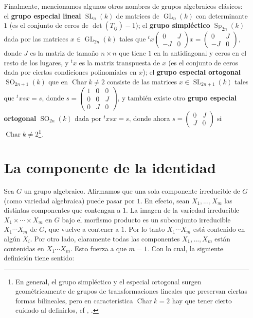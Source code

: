 \documentclass[spanish,12pt]{amsart}
\theoremstyle{definition}
\theoremstyle{remark}
\numberwithin{equation}{section}
\newcommand{\Char}[1]{\operatorname{Char} #1}
\begin{document}
Finalmente, mencionamos algunos otros nombres de grupos algebraicos clásicos: el \textbf{grupo especial lineal} $\operatorname{SL}_n (k)$ de matrices de $\operatorname{GL}_n (k)$ con determinante $1$ (es el conjunto de ceros de $\det (T_{ij}) - 1$); el \textbf{grupo simpléctico} $\operatorname{Sp}_{2n} (k)$ dada por las matrices $x \in \operatorname{GL}_{2n} (k)$ tales que ${}^t x \begin{pmatrix} 0 & J \\ - J & 0 \end{pmatrix} x = \begin{pmatrix} 0 & J \\ - J & 0 \end{pmatrix}$, donde $J$ es la matriz de tamaño $n \times n$ que tiene $1$ en la antidiagonal y ceros en el resto de los lugares, y ${}^t x$ es la matriz transpuesta de $x$ (es el conjunto de ceros dada por ciertas condiciones polinomiales en $x$); el \textbf{grupo especial ortogonal} $\operatorname{SO}_{2n + 1} (k)$ que en $\Char k \neq 2$ consiste de las matrices $x \in \operatorname{SL}_{2n+1} (k)$ tales que ${}^t x s x = s$, donde $s = \begin{pmatrix} 1 & 0 & 0 \\ 0 & 0 & J \\ 0 & J & 0 \end{pmatrix}$, y también existe otro \textbf{grupo especial ortogonal} $\operatorname{SO}_{2n} (k)$ dada por ${}^t x s x = s$, donde ahora $s = \begin{pmatrix} 0 & J \\ J & 0 \end{pmatrix}$ si $\Char k \neq 2$\footnote{En general, el grupo simpléctico y el especial ortogonal surgen geométricamente de grupos de transformaciones lineales que preservan ciertas formas bilineales, pero en característica $\Char k = 2$ hay que tener cierto cuidado al definirlos, cf \cite{dieudonne1956groupesDeLieEtHyperalgebresDeLieSurUnCorpsDeCaracteristiqueP}, \cite[Ch. 1]{carter1989simpleGroupsOfLieType}.}.




\section{La componente de la identidad}

Sea $G$ un grupo algebraico. Afirmamos que una sola componente irreducible de $G$ (como variedad algebraica) puede pasar por $1$. En efecto, sean $X_1, \ldots, X_m$ las distintas componentes que contengan a $1$. La imagen de la variedad irreducible $X_1 \times \cdots \times X_m$ en $G$ bajo el morfismo producto es un subconjunto irreducible $X_1 \cdots X_m$ de $G$, que vuelve a contener a $1$. Por lo tanto $X_1 \cdots X_m$ está contenido en algún $X_i$. Por otro lado, claramente todas las componentes $X_1, \ldots, X_m$ están contenidas en $X_1 \cdots X_m$. Esto fuerza a que $m = 1$. Con lo cual, la siguiente definición tiene sentido:
\end{document}
